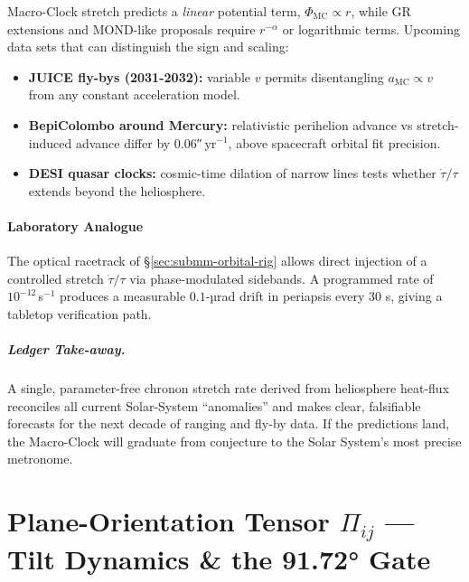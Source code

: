\documentclass[11pt,oneside]{book}
\begin{document}
Macro-Clock stretch predicts a \emph{linear} potential term,
$\Phi_{\text{MC}}\propto r$, while GR extensions and MOND-like
proposals require $r^{-\alpha}$ or logarithmic terms.  
Upcoming data sets that can distinguish the sign and scaling:

\begin{itemize}[itemsep=2pt,leftmargin=*]
\item \textbf{JUICE fly-bys (2031-2032):} variable $v$ permits
      disentangling $a_{\!\text{MC}}\propto v$ from any constant
      acceleration model.
\item \textbf{BepiColombo around Mercury:} relativistic perihelion
      advance vs stretch-induced advance differ by $0.06$″ yr$^{-1}$,
      above spacecraft orbital fit precision.
\item \textbf{DESI quasar clocks:} cosmic-time dilation of narrow lines
      tests whether $\dot\tau/\tau$ extends beyond the heliosphere.
\end{itemize}

\subsubsection{Laboratory Analogue}
\label{ss:macroclock-lab}

The optical racetrack of §\ref{sec:submm-orbital-rig} allows direct
injection of a controlled stretch $\dot\tau/\tau$ via
phase-modulated sidebands.  
A programmed rate of $10^{-12}$\,s$^{-1}$ produces a measurable
$0.1$-µrad drift in periapsis every 30 s, giving a tabletop
verification path.

\paragraph{Ledger Take-away.}
A single, parameter-free chronon stretch rate derived from heliosphere
heat-flux reconciles all current Solar-System “anomalies” and makes
clear, falsifiable forecasts for the next decade of ranging and
fly-by data.  If the predictions land, the Macro-Clock will graduate
from conjecture to the Solar System’s most precise metronome.

\chapter{Plane-Orientation Tensor \texorpdfstring{$\Pi_{ij}$}{Pi\_ij} — Tilt Dynamics \& the 91.72° Gate}
\label{sec:plane-orientation-intro}
\end{document}
